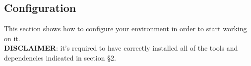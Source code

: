 \subsection{Configuration}
This section shows how to configure your environment in order to start working on it.\\
\textbf{DISCLAIMER}: it's required to have correctly installed all of the tools and dependencies indicated in section §2.




